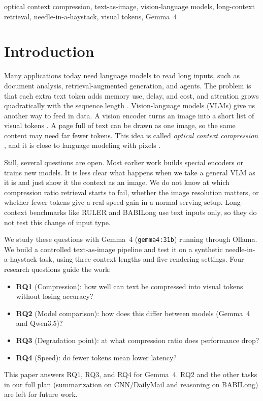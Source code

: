 \documentclass[conference]{IEEEtran}
\begin{document}
\begin{IEEEkeywords}
optical context compression, text-as-image, vision-language models, long-context retrieval, needle-in-a-haystack, visual tokens, Gemma~4
\end{IEEEkeywords}

\section{Introduction}
Many applications today need language models to read long inputs, such as document analysis, retrieval-augmented generation, and agents. The problem is that each extra text token adds memory use, delay, and cost, and attention grows quadratically with the sequence length \cite{vaswani2017attention}. Vision-language models (VLMs) give us another way to feed in data. A vision encoder turns an image into a short list of visual tokens \cite{dosovitskiy2021vit}. A page full of text can be drawn as one image, so the same content may need far fewer tokens. This idea is called \emph{optical context compression} \cite{wei2025deepseekocr,cheng2025glyph}, and it is close to language modeling with pixels \cite{rust2023pixel}.

Still, several questions are open. Most earlier work builds special encoders or trains new models. It is less clear what happens when we take a general VLM as it is and just show it the context as an image. We do not know at which compression ratio retrieval starts to fail, whether the image resolution matters, or whether fewer tokens give a real speed gain in a normal serving setup. Long-context benchmarks like RULER \cite{hsieh2024ruler} and BABILong \cite{kuratov2024babilong} use text inputs only, so they do not test this change of input type.

We study these questions with Gemma~4 (\texttt{gemma4:31b}) running through Ollama. We build a controlled text-as-image pipeline and test it on a synthetic needle-in-a-haystack task, using three context lengths and five rendering settings. Four research questions guide the work:
\begin{itemize}
\item \textbf{RQ1} (Compression): how well can text be compressed into visual tokens without losing accuracy?
\item \textbf{RQ2} (Model comparison): how does this differ between models (Gemma~4 and Qwen3.5)?
\item \textbf{RQ3} (Degradation point): at what compression ratio does performance drop?
\item \textbf{RQ4} (Speed): do fewer tokens mean lower latency?
\end{itemize}
This paper answers RQ1, RQ3, and RQ4 for Gemma~4. RQ2 and the other tasks in our full plan (summarization on CNN/DailyMail and reasoning on BABILong) are left for future work.
\end{document}
